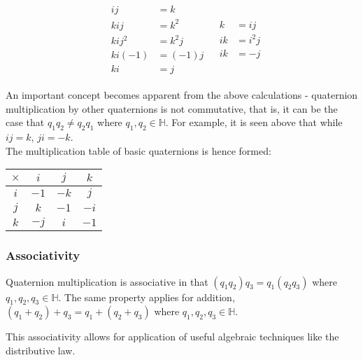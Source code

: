 \documentclass[12pt, a4paper]{article}
\begin{document}
\begin{align*}
     &
    \begin{aligned}
        ij     & = k     \\
        kij    & = k^2   \\
        kij^2  & = k^2j  \\
        ki(-1) & = (-1)j \\
        ki     & = j
    \end{aligned}
     &
    \begin{aligned}
        k  & = ij   \\
        ik & = i^2j \\
        ik & = -j
    \end{aligned}
\end{align*}

An important concept becomes apparent from the above calculations - quaternion
multiplication by other quaternions is not commutative, that is, it can be the
case that $q_1q_2 \neq q_2q_1$ where $ q_1,q_2 \in \mathbb{H}$. For example, it
is seen above that while $ij = k$, $ji = -k$. \\

The multiplication table of basic quaternions is hence formed:

\begin{center}
    \doublespacing
    \begin{tabular}{ | c | c | c | c | }
        \hline
        $\times$ & $i$  & $j$  & $k$  \\
        \hline
        $i$      & $-1$ & $-k$ & $j$  \\
        \hline
        $j$      & $k$  & $-1$ & $-i$ \\
        \hline
        $k$      & $-j$ & $i$  & $-1$ \\
        \hline
    \end{tabular}
    \label{sophisticatedtable}
\end{center}

\subsubsection{Associativity}
Quaternion multiplication is associative in that $(q_1 q_2) q_3 = q_1 (q_2 q_3)$
where $q_1,q_2,q_3 \in \mathbb{H}$.
The same property applies for addition, $(q_1 + q_2) + q_3 = q_1 + (q_2 + q_3)$
where $q_1,q_2,q_3 \in \mathbb{H}$.

This associativity allows for application of useful algebraic
techniques like the distributive law.
\end{document}

